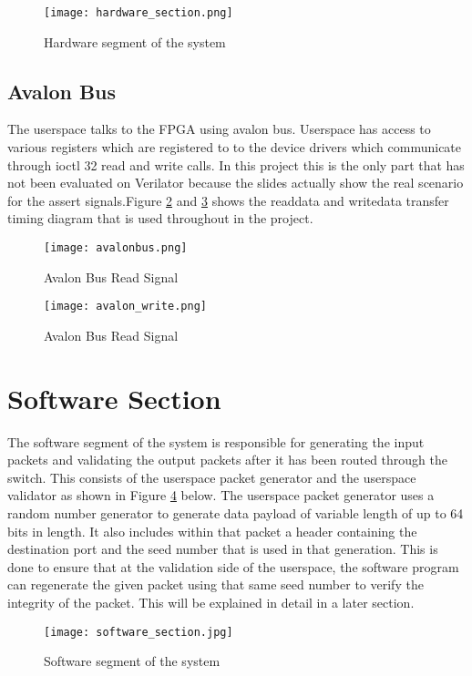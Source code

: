 \documentclass[twoside,12pt,fleqn]{book} %
\begin{document}
    \begin{figure}[ht]
        \centering
        \texttt{[image: hardware\_section.png]}
        \caption{Hardware segment of the system}
        \label{fig:hardware_section}
    \end{figure}
\subsection{Avalon Bus} The userspace talks to the FPGA using avalon bus. Userspace has access to various registers which are registered to to the device drivers which communicate through ioctl 32 read and write calls. In this project this is the only part that has not been evaluated on Verilator because the slides actually show the real scenario for the assert signals.Figure \ref{fig:avalonbus} and \ref{fig:avalon_write} shows the readdata and writedata transfer timing diagram that is used throughout in the project.
\begin{figure}[ht]
    \centering
    \texttt{[image: avalonbus.png]}
    \caption{Avalon Bus Read Signal}
    \label{fig:avalonbus}
\end{figure}
\begin{figure}[ht]
    \centering
    \texttt{[image: avalon\_write.png]}
    \caption{Avalon Bus Read Signal}
    \label{fig:avalon_write}
\end{figure}
\section{Software Section}
The software segment of the system is responsible for generating the input packets and validating the output packets after it has been routed through the switch. This consists of the userspace packet generator and the userspace validator as shown in Figure \ref{fig:software_section} below. The userspace packet generator uses a random number generator to generate data payload of variable length of up to 64 bits in length. It also includes within that packet a header containing the destination port and the seed number that is used in that generation. This is done to ensure that at the validation side of the userspace, the software program can regenerate the given packet using that same seed number to verify the integrity of the packet. This will be explained in detail in a later section.
\begin{figure}[ht]
        \centering
        \texttt{[image: software\_section.jpg]}
        \caption{Software segment of the system}
        \label{fig:software_section}
    \end{figure}
\end{document}
